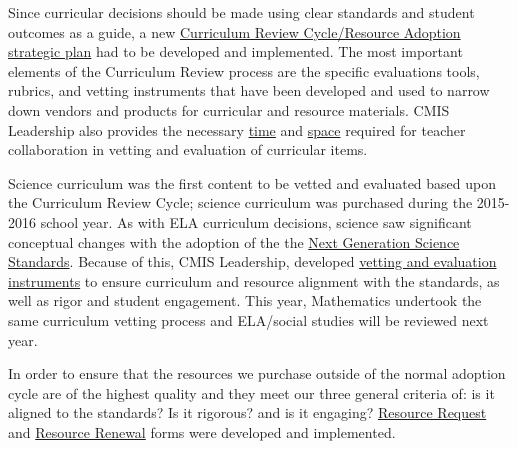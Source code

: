 \begin{findings}
\href{https://docs.google.com/a/cmis.ac.th/document/d/1hh1nLUlJgg1hd7s6aG3u3We0L6o7Wg_ECdjc2f6DcT8/edit?usp=sharing}{}

Since curricular decisions should be made using clear standards and student outcomes as a guide, a new \href{https://docs.google.com/presentation/d/15ZhVBwOO3psFCM44ybsXFUNqrhpHmVHdekAzIXjRJ5U/edit?usp=sharing}{Curriculum Review Cycle/Resource Adoption strategic plan} had to be developed and implemented. The most important elements of the Curriculum Review process are the specific evaluations tools, rubrics, and vetting instruments that have been developed and used to narrow down vendors and products for curricular and resource materials. CMIS Leadership also provides the necessary \href{https://drive.google.com/file/d/0B4n_WCeTYd4_U2J0YnRWYVp4bk0/view?usp=sharing}{time} and \href{https://drive.google.com/file/d/0B4n_WCeTYd4_NjBfVm92blF6T00/view?usp=sharing}{space} required for teacher collaboration in vetting and evaluation of curricular items. 

Science curriculum was the first content to be vetted and evaluated based upon the Curriculum Review Cycle; science curriculum was purchased during the 2015-2016 school year. As with ELA curriculum decisions, science saw significant conceptual changes with the adoption of the the \href{https://drive.google.com/a/cmis.ac.th/file/d/0B71_pYxcTLo-eUtQZE9DLTFvYUE/view?usp=sharing}{Next Generation Science Standards}. Because of this, CMIS Leadership, developed \href{https://docs.google.com/a/cmis.ac.th/document/d/1u0crwv2uVJdfamGYP9NYsUvub7bkPO64dIu0uAAkSIo/edit?usp=sharing}{vetting and evaluation instruments} to ensure curriculum and resource alignment with the standards, as well as rigor and student engagement. This year, Mathematics undertook the same curriculum vetting process and ELA/social studies will be reviewed next year. 

In order to ensure that the resources we purchase outside of the normal adoption cycle are of the highest quality and they meet our three general criteria of: is it aligned to the standards? Is it rigorous? and is it engaging? \href{https://goo.gl/forms/715q4GLbzFj9JRPZ2}{Resource Request} and \href{https://goo.gl/forms/N2Oow0UnpUr7bOzw1}{Resource Renewal} forms were developed and implemented. 



\end{findings}

